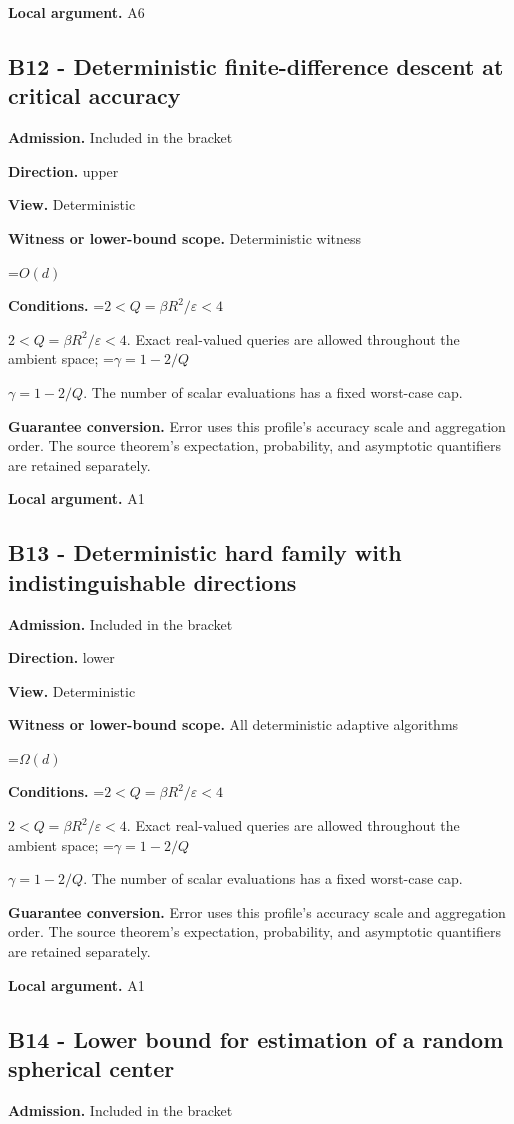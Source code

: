 \documentclass[10pt,a4paper]{article}
\newcommand{\AtlasMath}[1]{\par\begingroup\centering\setbox0=\hbox{$\displaystyle #1$}\ifdim\wd0>1.4\linewidth\typeout{ATLAS WIDE FORMULA: \the\wd0}\fi\ifdim\wd0>\linewidth\resizebox{\linewidth}{!}{\box0}\else\box0\fi\par\endgroup}
\newcommand{\AtlasInlineMath}[1]{\begingroup\setbox0=\hbox{$#1$}\ifdim\wd0>.4\linewidth\endgroup\AtlasMath{#1}\else\endgroup$#1$\fi}
\begin{document}
\textbf{Local argument.} A6

\subsection{B12 - Deterministic finite-difference descent at critical accuracy}
\textbf{Admission.} Included in the bracket

\textbf{Direction.} upper

\textbf{View.} Deterministic

\textbf{Witness or lower-bound scope.} Deterministic witness

\AtlasMath{O(d)}
\textbf{Conditions.} \AtlasInlineMath{2<Q=\beta R^2/\varepsilon<4}. Exact real-valued queries are allowed throughout the ambient space; \AtlasInlineMath{\gamma=1-2/Q}. The number of scalar evaluations has a fixed worst-case cap.

\textbf{Guarantee conversion.} Error uses this profile's accuracy scale and aggregation order. The source theorem's expectation, probability, and asymptotic quantifiers are retained separately.

\textbf{Local argument.} A1

\subsection{B13 - Deterministic hard family with indistinguishable directions}
\textbf{Admission.} Included in the bracket

\textbf{Direction.} lower

\textbf{View.} Deterministic

\textbf{Witness or lower-bound scope.} All deterministic adaptive algorithms

\AtlasMath{\Omega(d)}
\textbf{Conditions.} \AtlasInlineMath{2<Q=\beta R^2/\varepsilon<4}. Exact real-valued queries are allowed throughout the ambient space; \AtlasInlineMath{\gamma=1-2/Q}. The number of scalar evaluations has a fixed worst-case cap.

\textbf{Guarantee conversion.} Error uses this profile's accuracy scale and aggregation order. The source theorem's expectation, probability, and asymptotic quantifiers are retained separately.

\textbf{Local argument.} A1

\subsection{B14 - Lower bound for estimation of a random spherical center}
\textbf{Admission.} Included in the bracket
\end{document}
